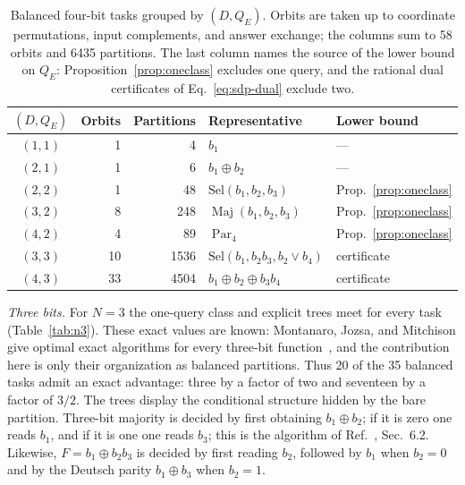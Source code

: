\documentclass[
  aps,
  pra,
  reprint,
  nofootinbib
]{revtex4-2}
\begin{document}
\begin{table}[t]
\caption{Balanced four-bit tasks grouped by \((D,Q_E)\). Orbits are taken up
to coordinate permutations, input complements, and answer exchange; the
columns sum to 58 orbits and 6435 partitions. The last column names the source
of the lower bound on \(Q_E\): Proposition~\ref{prop:oneclass} excludes one
query, and the rational dual certificates of Eq.~\eqref{eq:sdp-dual} exclude
two.}
\label{tab:n4}
\begin{ruledtabular}
\begin{tabular}{crrll}
\((D,Q_E)\) & Orbits & Partitions & Representative & Lower bound\\
\hline
\((1,1)\) & 1 & 4 & \(b_1\) & ---\\
\((2,1)\) & 1 & 6 & \(b_1\oplus b_2\) & ---\\
\((2,2)\) & 1 & 48 & \(\mathrm{Sel}(b_1,b_2,b_3)\) & Prop.~\ref{prop:oneclass}\\
\((3,2)\) & 8 & 248 & \(\operatorname{Maj}(b_1,b_2,b_3)\) & Prop.~\ref{prop:oneclass}\\
\((4,2)\) & 4 & 89 & \(\operatorname{Par}_4\) & Prop.~\ref{prop:oneclass}\\
\((3,3)\) & 10 & 1536 & \(\mathrm{Sel}(b_1,b_2b_3,b_2\lor b_4)\) & certificate\\
\((4,3)\) & 33 & 4504 & \(b_1\oplus b_2\oplus b_3b_4\) & certificate\\
\end{tabular}
\end{ruledtabular}
\end{table}

\emph{Three bits.} For \(N=3\) the one-query class and explicit trees meet for
every task (Table~\ref{tab:n3}). These exact values are known: Montanaro,
Jozsa, and Mitchison give optimal exact algorithms for every three-bit
function~\cite{MontanaroJozsaMitchison2015}, and the contribution here is only
their organization as balanced partitions. Thus 20 of the 35 balanced tasks
admit an exact advantage: three by a factor of two and seventeen by a factor of
\(3/2\). The trees display the conditional structure hidden by the bare
partition. Three-bit majority is decided by first obtaining \(b_1\oplus b_2\);
if it is zero one reads \(b_1\), and if it is one one reads \(b_3\); this is the
algorithm of Ref.~\cite{MontanaroJozsaMitchison2015}, Sec.~6.2. Likewise,
\(F=b_1\oplus b_2b_3\) is decided by first reading \(b_2\), followed by \(b_1\)
when \(b_2=0\) and by the Deutsch parity \(b_1\oplus b_3\) when \(b_2=1\).
\end{document}
